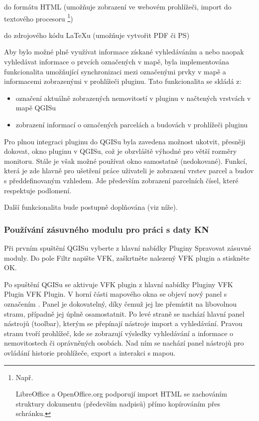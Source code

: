 \documentclass[a4paper,10pt]{article}
\begin{document}
\begin{itemize}
\item do formátu HTML (umožňuje zobrazení ve webovém prohlížeči, import do textového procesoru \footnote{Např. \item LibreOffice a OpenOffice.org podporují import HTML se zachováním struktury dokumentu (především nadpisů) přímo kopírováním přes schránku.})
\item do zdrojového kódu LaTeXu (umožňuje vytvořit PDF či PS)
\end{itemize}

Aby bylo možné plně využívat informace získané vyhledáváním a nebo naopak vyhledávat informace o prvcích označených v mapě, byla implementována funkcionalita umožňující synchronizaci mezi označenými prvky v mapě a informacemi zobrazenými v prohlížeči pluginu. Tato funkcionalita se skládá z:
\begin{itemize}
\item označení aktuálně zobrazených nemovitostí v pluginu v načtených vrstvách v mapě QGISu
\item zobrazení informací o označených parcelách a budovách v prohlížeči pluginu
\end{itemize}

Pro plnou integraci pluginu do QGISu byla zavedena možnost ukotvit, přesněji dokovat, okno pluginu v QGISu, což je obzvláště výhodné pro větší rozměry monitoru.
Stále je však možné používat okno samostatně (nedokované).
Funkcí, která je zde hlavně pro ušetření práce uživateli je zobrazení vrstev parcel a budov s předdefinovaným vzhledem.
Jde především zobrazení parcelních čísel, které respektuje podlomení.

Další funkcionalita bude postupně doplňována (viz níže).


\subsubsection{Používání zásuvného modulu pro práci s daty KN}
Při prvním spuštění QGISu vyberte z hlavní nabídky Pluginy \textrightarrow{} Spravovat zásuvné moduly.
Do pole Filtr napište VFK, zaškrtněte nalezený VFK plugin a stiskněte OK.

Po spuštění QGISu se aktivuje VFK plugin z hlavní nabídky Pluginy \textrightarrow{} VFK Plugin \textrightarrow{} VFK Plugin.
V horní části mapového okna se objeví nový panel s označením .
Panel je dokovatelný, díky čemuž jej lze přemístit na libovolnou stranu, případně jej úplně osamostatnit.
Po levé straně se nachází hlavní panel nástrojů (toolbar), kterým se přepínají nástroje import a vyhledávání.
Pravou stranu tvoří prohlížeč, kde se zobrazují výsledky vyhledávání a informace o nemovitostech či oprávněných osobách.
Nad ním se nachází panel nástrojů pro ovládání historie prohlížeče, export a interakci s mapou.
\end{document}

